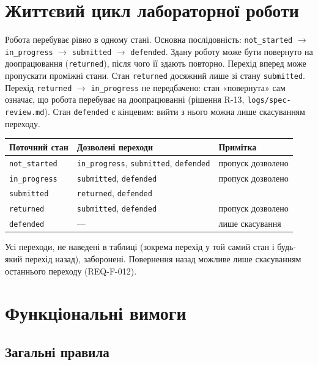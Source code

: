 \documentclass[12pt,a4paper]{article}
\newcommand{\code}[1]{\texttt{#1}}
\begin{document}
\section{Життєвий цикл лабораторної роботи}\label{sec:lifecycle}

Робота перебуває рівно в одному стані.
Основна послідовність: \code{not\_started} $\to$ \code{in\_progress} $\to$ \code{submitted} $\to$ \code{defended}.
Здану роботу може бути повернуто на доопрацювання (\code{returned}), після чого її здають повторно.
Перехід вперед може пропускати проміжні стани.
Стан \code{returned} досяжний лише зі стану \code{submitted}.
Перехід \code{returned} $\to$ \code{in\_progress} не передбачено: стан «повернута» сам означає, що робота перебуває на доопрацюванні (рішення R-13, \code{logs/spec-review.md}).
Стан \code{defended} є кінцевим: вийти з нього можна лише скасуванням переходу.

\begin{center}
\begin{tabular}{lll}
\toprule
\textbf{Поточний стан} & \textbf{Дозволені переходи} & \textbf{Примітка} \\
\midrule
\code{not\_started} & \code{in\_progress}, \code{submitted}, \code{defended} & пропуск дозволено \\
\code{in\_progress} & \code{submitted}, \code{defended} & пропуск дозволено \\
\code{submitted} & \code{returned}, \code{defended} & \\
\code{returned} & \code{submitted}, \code{defended} & пропуск дозволено \\
\code{defended} & --- & лише скасування \\
\bottomrule
\end{tabular}
\end{center}

Усі переходи, не наведені в таблиці (зокрема перехід у той самий стан і будь-який перехід назад), заборонені.
Повернення назад можливе лише скасуванням останнього переходу (REQ-F-012).

\section{Функціональні вимоги}

\subsection{Загальні правила}
\end{document}
